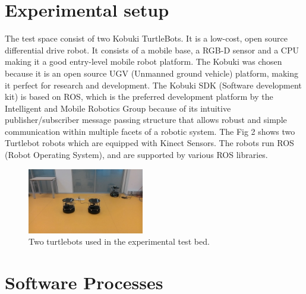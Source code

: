 \documentclass[journal]{IEEEtran}
\begin{document}
\section{Experimental setup}

The test space consist of two Kobuki TurtleBots. It is a low-cost, open source differential drive robot. It consists of a mobile base, a RGB-D sensor and a CPU making it a good  entry-level mobile robot platform. The Kobuki was chosen because it is an open source UGV (Unmanned ground vehicle) platform, making it perfect for research and development. The Kobuki SDK (Software development kit) is based on ROS, which is the preferred development platform by the Intelligent and Mobile Robotics Group because of its intuitive publisher/subscriber message passing structure that allows robust and simple communication within multiple  facets of a robotic system. The Fig 2 shows two Turtlebot robots which are equipped with Kinect Sensors. The robots run ROS (Robot Operating System), and are supported by various ROS libraries. 

\begin{figure}[!h]
\begin{center}
\includegraphics[width=2in]{two.jpg}
\caption{Two turtlebots used in the experimental test bed.}
\end{center}
\label{fig:mypicture2}
\end{figure}









\section{Software Processes}
\end{document}
